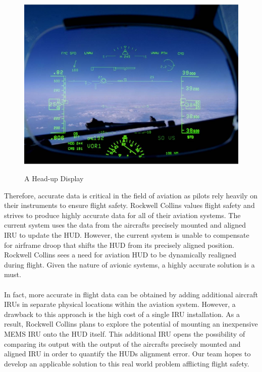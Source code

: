 \documentclass[letterpaper,10pt,onecolumn]{IEEEtran}
\begin{document}
\begin{figure}
  	\centering
  		\caption{A Head-up Display }
      	\includegraphics{hud}
    \label{fig:hud}
\end{figure}

\noindent
Therefore, accurate data is critical in the field of aviation as pilots rely heavily on their instruments to ensure flight safety. Rockwell Collins values flight safety and strives to produce highly accurate data for all of their aviation systems. The current system uses the data from the aircraft\textquotesingle s precisely mounted and aligned IRU to update the HUD. However, the current system is unable to compensate for airframe droop that shifts the HUD from its precisely aligned position. Rockwell Collins sees a need for aviation HUD to be dynamically realigned during flight. Given the nature of avionic systems, a highly accurate solution is a must.\\\\
In fact, more accurate in flight data can be obtained by adding additional aircraft IRUs in separate physical locations within the aviation system. However, a drawback to this approach is the high cost of a single IRU installation. As a result, Rockwell Collins plans to explore the potential of mounting an inexpensive MEMS IRU onto the HUD itself. This additional IRU opens the possibility of comparing its output with the output of the aircraft\textquotesingle s precisely mounted and aligned IRU in order to quantify the HUDs alignment error. Our team hopes to develop an applicable solution to this real world problem afflicting flight safety.
\end{document}

